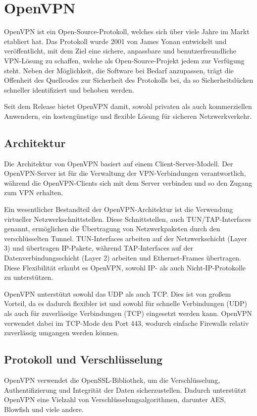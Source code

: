 \section{OpenVPN} \label{openvpn}
OpenVPN ist ein Open-Source-Protokoll, welches sich über viele Jahre im Markt etabliert hat. Das Protokoll wurde 2001 von James Yonan entwickelt und veröffentlicht, mit dem Ziel eine sichere, anpassbare und benutzerfreundliche \gls{VPN}-Lösung zu schaffen, welche als Open-Source-Projekt jedem zur Verfügung steht. Neben der Möglichkeit, die Software bei Bedarf anzupassen, trägt die Offenheit des Quellcodes zur Sicherheit des Protokolls bei, da so Sicherheitslücken schneller identifiziert und behoben werden.

Seit dem Release bietet OpenVPN damit, sowohl privaten als auch kommerziellen Anwendern, ein kostengünstige und flexible Lösung für sicheren Netzwerkverkehr.

\subsection{Architektur}
Die Architektur von OpenVPN basiert auf einem Client-Server-Modell. Der OpenVPN-Server ist für die Verwaltung der \gls{VPN}-Verbindungen verantwortlich, während die OpenVPN-Clients sich mit dem Server verbinden und so den Zugang zum \gls{VPN} erhalten.

Ein wesentlicher Bestandteil der OpenVPN-Architektur ist die Verwendung virtueller Netzwerkschnittstellen. Diese Schnittstellen, auch TUN/TAP-Interfaces genannt, ermöglichen die Übertragung von Netzwerkpaketen durch den verschlüsselten Tunnel. TUN-Interfaces arbeiten auf der Netzwerkschicht (Layer 3) und übertragen \gls{IP}-Pakete, während TAP-Interfaces auf der Datenverbindungsschicht (Layer 2) arbeiten und Ethernet-Frames übertragen. Diese Flexibilität erlaubt es OpenVPN, sowohl \gls{IP}- als auch Nicht-\gls{IP}-Protokolle zu unterstützen.

OpenVPN unterstützt sowohl das \gls{UDP} als auch \gls{TCP}. Dies ist von großem Vorteil, da es dadurch flexibler ist und sowohl für schnelle Verbindungen (\gls{UDP}) als auch für zuverlässige Verbindungen (\gls{TCP}) eingesetzt werden kann. OpenVPN verwendet dabei im \gls{TCP}-Mode den Port 443, wodurch einfache Firewalls relativ zuverlässig umgangen werden können. 

\subsection{Protokoll und Verschlüsselung}
OpenVPN verwendet die OpenSSL-Bibliothek, um die Verschlüsselung, Authentifizierung und Integrität der Daten sicherzustellen. Dadurch unterstützt OpenVPN eine Vielzahl von Verschlüsselungsalgorithmen, darunter \gls{AES}, Blowfish und viele andere.

